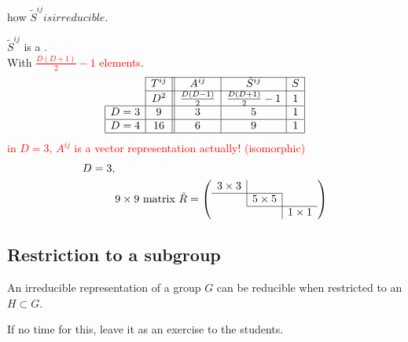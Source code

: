 \documentclass[11pt,fleqn]{book} %
\begin{document}
\begin{itemize}
  \begin{exercise}
    how \(\tilde{S}^{ij} is irreducible.\)
  \end{exercise}
  \(\tilde{S}^{ij}\) is a . \\
  With \textcolor{red}{\(\frac{D(D+1)}{2} - 1\) elements}. \\
  \begin{align*}
    \begin{array}{|c|c||c|c|c|}
      \cline{2-5}
      \multicolumn{1}{l|}{} & T^{ij} & A^{ij} & \tilde{S}^{ij} & S \\ \cline{2-5}
      \multicolumn{1}{l|}{} & D^2 & \frac{D(D-1)}{2} & \frac{D(D+1)}{2} - 1 & 1 \\ \hline
      D=3 & 9 & 3 & 5 & 1 \\ \hline
      D=4& 16 & 6 & 9 & 1 \\ \hline
    \end{array}
  \end{align*}
  \textcolor{red}{in \(D = 3\), \(A^{ij}\) is a vector representation actually! (isomorphic)}
  \begin{align*}
    D = 3,& \\
    & 9 \times 9 \ \text{matrix}\ \tilde{R} = \left( \begin{array}{*{3}{c}}
                                 \multicolumn{1}{l|}{3 \times 3} & &  \\ \cline{1-2}
                                                                 & \multicolumn{1}{|l|}{5 \times 5} &   \\ \cline{2-3}
                                                                 & &\multicolumn{1}{|l}{1 \times 1} \\
                               \end{array} \right)
  \end{align*}
\end{itemize}

\subsection{Restriction to a subgroup}
An irreducible representation of a group \(G\) can be reducible when restricted
to an \(H \subset G\).
\begin{exercise}
  If no time for this, leave it as an exercise to the students.
\end{exercise}
\end{document}
